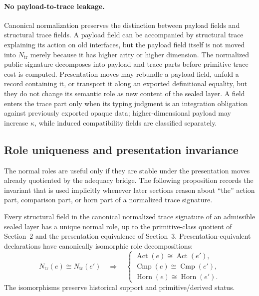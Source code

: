 \documentclass{lmcs}
\begin{document}
\paragraph{No payload-to-trace leakage.}
Canonical normalization preserves the distinction between payload fields and structural trace
fields.  A payload field can be accompanied by structural trace explaining its action on old
interfaces, but the payload field itself is not moved into \(N_{\mathrm{tr}}\) merely because it
has higher arity or higher dimension.
The normalized public signature decomposes into payload and trace parts before primitive trace
cost is computed.  Presentation moves may rebundle a payload field, unfold a record containing
it, or transport it along an exported definitional equality, but they do not change its semantic
role as new content of the sealed layer.  A field enters the trace part only when its typing
judgment is an integration obligation against previously exported opaque data; higher-dimensional
payload may increase \(\kappa\), while induced compatibility fields are classified separately.

\subsection{Role uniqueness and presentation invariance}

The normal roles are useful only if they are stable under the presentation moves already
quotiented by the adequacy bridge.  The following proposition records the invariant that is
used implicitly whenever later sections reason about ``the'' action part, comparison part, or
horn part of a normalized trace signature.

\begin{prop}
Every structural field in the canonical normalized trace signature of an admissible sealed
layer has a unique normal role, up to the primitive-class quotient of Section~2 and the
presentation equivalence of Section~3.  Presentation-equivalent declarations have canonically
isomorphic role decompositions:
\[
  N_{\mathrm{tr}}(e)
  \cong
  N_{\mathrm{tr}}(e')
  \quad\Longrightarrow\quad
  \begin{cases}
    \operatorname{Act}(e) \cong \operatorname{Act}(e'),\\
    \operatorname{Cmp}(e) \cong \operatorname{Cmp}(e'),\\
    \operatorname{Horn}(e) \cong \operatorname{Horn}(e').
  \end{cases}
\]
The isomorphisms preserve historical support and primitive/derived status.
\end{prop}
\end{document}
